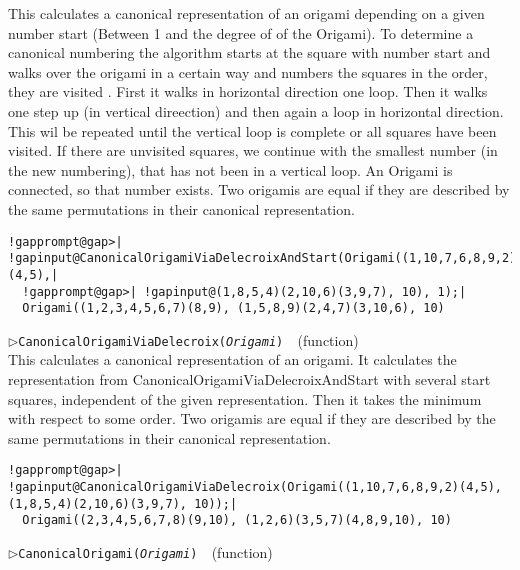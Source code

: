 \documentclass[a4paper,11pt]{report}
\begin{document}
{{{ This calculates a canonical representation of an origami depending on a given
number start (Between 1 and the degree of of the Origami). To determine a
canonical numbering the algorithm starts at the square with number start and
walks over the origami in a certain way and numbers the squares in the order,
they are visited . First it walks in horizontal direction one loop. Then it
walks one step up (in vertical direection) and then again a loop in horizontal
direction. This wil be repeated until the vertical loop is complete or all
squares have been visited. If there are unvisited squares, we continue with
the smallest number (in the new numbering), that has not been in a vertical
loop. An Origami is connected, so that number exists. Two origamis are equal
if they are described by the same permutations in their canonical
representation. 
\begin{Verbatim}[commandchars=!@|,fontsize=\small,frame=single,label=Example]
  !gapprompt@gap>| !gapinput@CanonicalOrigamiViaDelecroixAndStart(Origami((1,10,7,6,8,9,2)(4,5),|
  !gapprompt@gap>| !gapinput@(1,8,5,4)(2,10,6)(3,9,7), 10), 1);|
  Origami((1,2,3,4,5,6,7)(8,9), (1,5,8,9)(2,4,7)(3,10,6), 10)
\end{Verbatim}
 \noindent\textcolor{FuncColor}{$\triangleright$\enspace\texttt{CanonicalOrigamiViaDelecroix({\mdseries\slshape Origami})
\label{CanonicalOrigamiViaDelecroix}
}\hfill{\scriptsize (function)}}\\


 This calculates a canonical representation of an origami. It calculates the
representation from CanonicalOrigamiViaDelecroixAndStart with several start
squares, independent of the given representation. Then it takes the minimum
with respect to some order. Two origamis are equal if they are described by
the same permutations in their canonical representation. 
\begin{Verbatim}[commandchars=!@|,fontsize=\small,frame=single,label=Example]
  !gapprompt@gap>| !gapinput@CanonicalOrigamiViaDelecroix(Origami((1,10,7,6,8,9,2)(4,5), (1,8,5,4)(2,10,6)(3,9,7), 10));|
  Origami((2,3,4,5,6,7,8)(9,10), (1,2,6)(3,5,7)(4,8,9,10), 10)
\end{Verbatim}
 \noindent\textcolor{FuncColor}{$\triangleright$\enspace\texttt{CanonicalOrigami({\mdseries\slshape Origami})
\label{CanonicalOrigami}
}\hfill{\scriptsize (function)}}\\


}}}
\end{document}
